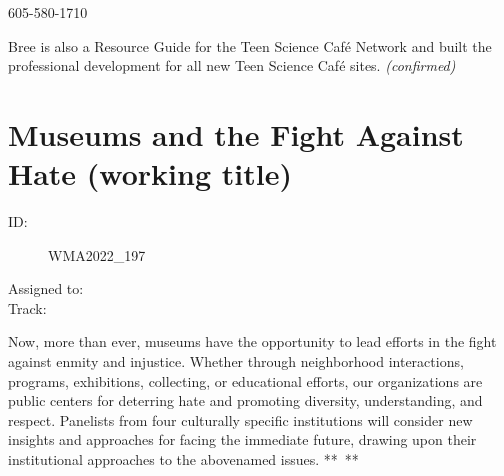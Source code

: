 \documentclass{report}
\begin{document}
                605-580-1710\newline

                Bree is also a Resource Guide for the Teen Science Café Network and built the professional development for all new Teen Science Café sites.
                \emph{ (confirmed) }
              

              

              

              
        
          \newpage
          \section{ Museums and the Fight Against Hate (working title) }
            \begin{description}
              \item [ID:]
              WMA2022\_197

              \item [Assigned to:]
                \item [Track:]
              \end{description}

              Now, more than ever, museums have the opportunity to lead efforts in the fight against enmity and injustice. Whether through neighborhood interactions, programs, exhibitions, collecting, or educational efforts, our organizations are public centers for deterring hate and promoting diversity, understanding, and respect. Panelists from four culturally specific institutions will consider new insights and approaches for facing the immediate future, drawing upon their institutional approaches to the abovenamed issues.
** **
\end{document}
